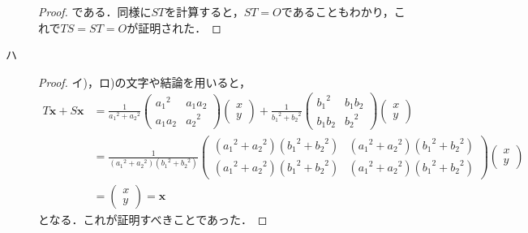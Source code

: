\documentclass[uplatex,dvipdfmx,a4paper,10pt,fleqn]{jsarticle}
\begin{document}
\begin{leftbar}
\begin{description}
\begin{proof}
        である．同様に$ST$を計算すると，$ST=O$であることもわかり，これで$TS=ST=O$が証明された．
    \end{proof}
\item[ハ]
    \begin{proof}
    イ)，ロ)の文字や結論を用いると，
        \begin{align*}
        T \bm{x} + S \bm{x} & =
        \frac{1}{{a_1}^2+{a_2}^2}
        \begin{pmatrix}
            {a_1}^2 & a_1 a_2 \\
            a_1 a_2 & {a_2}^2
        \end{pmatrix}
        \begin{pmatrix}
            x \\
            y
        \end{pmatrix}
        +
        \frac{1}{{b_1}^2+{b_2}^2}
        \begin{pmatrix}
            {b_1}^2 & b_1 b_2 \\
            b_1 b_2 & {b_2}^2
        \end{pmatrix}
        \begin{pmatrix}
            x \\
            y
        \end{pmatrix}
        \\
        & = \frac{1}{({a_1}^2+{a_2}^2)({b_1}^2+{b_2}^2)}
        \begin{pmatrix}
            ({a_1}^2+{a_2}^2)({b_1}^2+{b_2}^2) & ({a_1}^2+{a_2}^2)({b_1}^2+{b_2}^2) \\
            ({a_1}^2+{a_2}^2)({b_1}^2+{b_2}^2) & ({a_1}^2+{a_2}^2)({b_1}^2+{b_2}^2)
        \end{pmatrix}
        \begin{pmatrix}
            x \\
            y
        \end{pmatrix}
        \\
        & =\begin{pmatrix}
            x \\
            y
        \end{pmatrix}
        =\bm{x}
    \end{align*}
    となる．これが証明すべきことであった．
\end{proof}
\end{description}
\end{leftbar}

\newpage 
\end{document}
